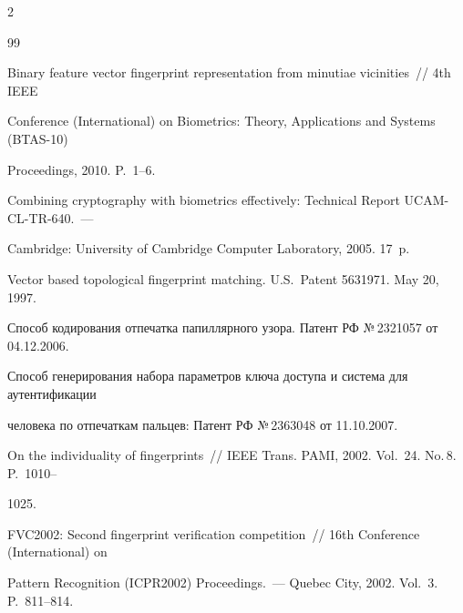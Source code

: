 \begin{multicols}{2}
{{\begin{thebibliography}{99}


Binary feature vector fingerprint representation from minutiae vicinities~//  4th IEEE  

Conference (International) on Biometrics: Theory, Applications and Systems (BTAS-10) 

Proceedings, 2010. P.~1--6.





Combining cryptography with biometrics effectively: Technical Report UCAM-CL-TR-640.~--- 

Cambridge: University of Cambridge Computer Laboratory, 2005. 17~p.





Vector based topological fingerprint matching. U.S.\ Patent 5631971. May 20, 1997.





Способ кодирования отпечатка папиллярного узора. Патент РФ №\,2321057 от 04.12.2006.





Способ генерирования набора параметров ключа доступа и система для аутентификации 

человека по отпечаткам пальцев: Патент РФ №\,2363048 от 11.10.2007.





On the individuality of fingerprints~// IEEE Trans. PAMI, 2002. Vol.~24. No.\,8. P.~1010--

1025. 



\label{end\stat}





FVC2002: Second fingerprint verification competition~// 16th Conference (International) on 

Pattern Recognition (ICPR2002) Proceedings.~--- Quebec City, 2002. Vol.~3. P.~811--814.

 \end{thebibliography}

}

}





\end{multicols}       



\newpage

